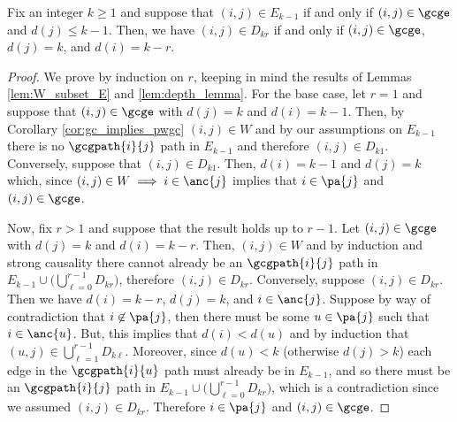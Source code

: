 \begin{lemma}
  \label{lem:inner_loop_lemma}
  Fix an integer $k \ge 1$ and suppose that $(i, j) \in E_{k - 1}$ if
  and only if $(i, j) \in \gcge$ and $d(j) \le k - 1$.  Then, we have
  $(i, j) \in D_{kr}$ if and only if $(i, j) \in \gcge $, $d(j) = k$,
  and $d(i) = k - r$.
\end{lemma}
\begin{proof}
  We prove by induction on $r$, keeping in mind the results of Lemmas
  \ref{lem:W_subset_E} and \ref{lem:depth_lemma}.  For the base case,
  let $r = 1$ and suppose that $(i, j) \in \gcge$ with $d(j) = k$ and
  $d(i) = k - 1$.  Then, by Corollary \ref{cor:gc_implies_pwgc}
  $(i, j) \in W$ and by our assumptions on $E_{k - 1}$ there is no
  $\gcgpath{i}{j}$ path in $E_{k - 1}$ and therefore
  $(i, j) \in D_{k1}$.  Conversely, suppose that $(i, j) \in D_{k1}$.
  Then, $d(i) = k - 1$ and $d(j) = k$ which, since
  $(i, j) \in W \implies i \in \anc{j}$ implies that $i \in \pa{j}$
  and $(i, j) \in \gcge$.

  Now, fix $r > 1$ and suppose that the result holds up to $r - 1$.
  Let $(i, j) \in \gcge$ with $d(j) = k$ and $d(i) = k - r$.  Then,
  $(i, j) \in W$ and by induction and strong causality there cannot
  already be an $\gcgpath{i}{j}$ path in
  $E_{k - 1} \cup \big(\bigcup_{\ell = 0}^{r - 1} D_{kr}\big)$,
  therefore $(i, j) \in D_{kr}$.  Conversely, suppose
  $(i, j) \in D_{kr}$.  Then we have $d(i) = k - r$, $d(j) = k$, and
  $i \in \anc{j}$.  Suppose by way of contradiction that
  $i \not\in \pa{j}$, then there must be some $u \in \pa{j}$ such that
  $i \in \anc{u}$.  But, this implies that $d(i) < d(u)$ and by
  induction that $(u, j) \in \bigcup_{\ell = 1}^{r - 1}D_{k\ell}$.
  Moreover, since $d(u) < k$ (otherwise $d(j) > k$) each edge in
  the $\gcgpath{i}{u}$ path must already be in $E_{k - 1}$, and so
  there must be an $\gcgpath{i}{j}$ path in
  $E_{k - 1}\cup\big(\bigcup_{\ell = 0}^{r - 1}D_{kr}\big)$, which is
  a contradiction since we assumed $(i, j) \in D_{kr}$.  Therefore
  $i \in \pa{j}$ and $(i, j) \in \gcge$.
\end{proof}

